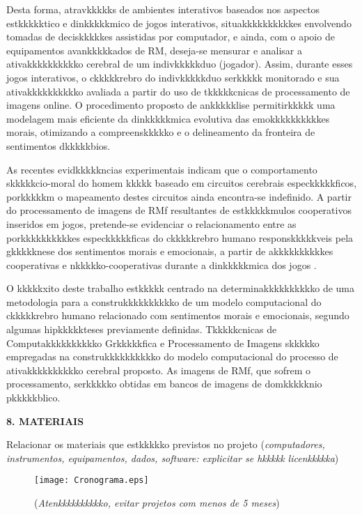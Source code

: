 \documentclass[a4paper,12pt,oneside,openany]{report}
\begin{document}
Desta forma, atravkkkkks de ambientes interativos baseados nos aspectos estkkkkktico e dinkkkkkmico de jogos interativos, situakkkkkkkkkkes envolvendo tomadas de deciskkkkkes assistidas por computador, e ainda, com o apoio de equipamentos avankkkkkados de RM, deseja-se mensurar e analisar a ativakkkkkkkkkko cerebral de um indivkkkkkduo (jogador). Assim, durante esses jogos interativos, o ckkkkkrebro do indivkkkkkduo serkkkkk monitorado e sua ativakkkkkkkkkko avaliada a partir do uso de tkkkkkcnicas de processamento de imagens online. O procedimento proposto de ankkkkklise permitirkkkkk uma modelagem mais eficiente da dinkkkkkmica evolutiva das emokkkkkkkkkkes morais, otimizando a compreenskkkkko e o delineamento da fronteira de sentimentos dkkkkkbios.

As recentes evidkkkkkncias experimentais indicam que o comportamento skkkkkcio-moral do homem kkkkk baseado em circuitos cerebrais especkkkkkficos, porkkkkkm o mapeamento destes circuitos ainda encontra-se indefinido. A partir do processamento de imagens de RMf resultantes de estkkkkkmulos cooperativos inseridos em jogos, pretende-se evidenciar o relacionamento entre as porkkkkkkkkkkes especkkkkkficas do ckkkkkrebro humano responskkkkkveis pela gkkkkknese dos sentimentos morais e emocionais, a partir de akkkkkkkkkkes cooperativas e nkkkkko-cooperativas durante a dinkkkkkmica dos jogos \cite{Binmore92}.  

O kkkkkxito deste trabalho estkkkkk centrado na determinakkkkkkkkkko de uma metodologia para a construkkkkkkkkkko de um modelo computacional do ckkkkkrebro humano relacionado com sentimentos morais e emocionais, segundo algumas hipkkkkkteses previamente definidas. Tkkkkkcnicas de Computakkkkkkkkkko Grkkkkkfica e Processamento de Imagens skkkkko empregadas na construkkkkkkkkkko do modelo computacional \cite{Lins98} do processo de ativakkkkkkkkkko cerebral proposto. As imagens de RMf, que sofrem o processamento, serkkkkko obtidas em bancos de imagens de domkkkkknio pkkkkkblico.

\vspace{0.4cm}
\textbf{8. MATERIAIS}
	
Relacionar os materiais que estkkkkko previstos no projeto (\textit{computadores, instrumentos, equipamentos, dados, software: explicitar se hkkkkk licenkkkkka})

\begin{figure}
      \begin{center}
      \parbox[h]{14cm}
        {
        \begin{center}
        \texttt{[image: Cronograma.eps]}
        \caption[\small{(\textit{Atenkkkkkkkkkko, evitar projetos com menos de 5 meses})}]{\label{Fig:Cronograma} \footnotesize{(\textit{Atenkkkkkkkkkko, evitar projetos com menos de 5 meses})}}
        \end{center}
        }
      \end{center}
\end{figure} 
\end{document}
